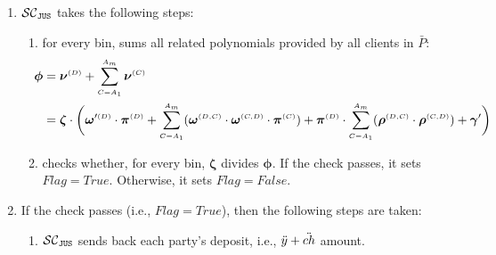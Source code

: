 \begin{enumerate}[leftmargin=4mm]
 \item\label{compute-res-poly}  $\mathcal{SC}_{\mathtt{JUS}}$ takes the following steps:
 \begin{enumerate}[leftmargin=1mm]
 \item for every bin, sums all related polynomials  provided by all clients in $\bar{P}$:
 \begin{equation*}
\begin{split}
\hspace{-9mm} \bm\phi&= \bm\nu^{\st  {  {(D)}} }+\sum\limits^{\st  {   A}_{\st  {   m}}}_{\st   {  {C }= }   {   A}_{\st  {  1}}}\bm\nu^{\st  {  {(C)}} }\\
 &= \bm\zeta\cdot \bigg(\bm\omega'^{\st  {  {(D)}}}\cdot \bm\pi^{\st  {  {(D)}} } +\sum\limits^{\st  {   A}_{  {   m}}}_{\st  {  {C }= }   {   A}_{\st  {  1}}}(\bm\omega^{\st  {  {(D,C)}}} \cdot \bm\omega^{\st  {  {(C,D)}}}\cdot \bm\pi^{\st  {  (C)}}) +\bm\pi^{\st  {  {(D)}}}\cdot\sum\limits^{\st  {   A}_{ \st {   m}}}_{\st  {C= }   {   A}_{\st  {  1}}}(\bm\rho^{\st  {  {(D,C)}}} \cdot \bm\rho^{\st  {  {(C,D)}}}) + \bm\gamma'\bigg)
  \end{split}
\end{equation*}
 
  \item\label{F-PSI:detect-misbehaving-party} checks whether, for every bin, $\bm\zeta$ divides $\bm\phi$. If the check passes, it sets $Flag=True$. Otherwise, it sets $Flag=False$. 
  
 
 
 \end{enumerate}
 
\item\label{F-PSI::flag-is-true} If the check passes (i.e., $Flag=True$), then the following steps are taken:

\begin{enumerate}[leftmargin=2mm]
 \item $\mathcal{SC}_{\mathtt{JUS}}$ sends back each party's deposit, i.e., $\ddot{y}+\ddot{ch}$ amount.
 

\end{enumerate}
\end{enumerate}
